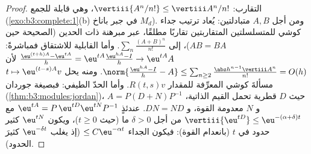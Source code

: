 \begin{proof}
التقارب: $\vertiii{A^n/n!} \leq \vertiii A^n/n!$، وهي قابلة للجمع (\cref{exo:b3:complete:1}(b) في جبر باناخ
$M_d$). ومن أجل $A, B$ متبادلتين: يُعاد ترتيب جداء كوشي
للمتسلسلتين المتقاربتين تقاربًا مطلقًا، عبر مبرهنة ذات الحدين
(الصحيحة حين $AB = BA$)، إلى $\sum_n\frac{(A+B)^n}{n!}$. وأما القابلية للاشتقاق
فمباشرةً: $\frac{\eu^{(t+h)A} - \eu^{tA}}h = \eu^{tA}\frac{\eu^{hA} -
I}{h} \to \eu^{tA}A$ لأن $\norm{\frac{\eu^{hA} - I}h - A}
\leq \sum_{n\geq2}\frac{\abs h^{n-1}\vertiii A^n}{n!} =
O(h)$. ومنه يحل $t \mapsto \eu^{(t - s)A}v$ مسألةَ كوشي
المعرِّفة للمقدار $R(t,s)v$. وأما الحدّ الطيفي: فبصيغة جوردان
(\cref{thm:b3:modules:jordan})، $A = P(D + N)P^{-1}$ حيث $D$ قطرية تحمل القيم الذاتية،
و $N$ معدومة القوة، و $DN =
ND$. عندئذٍ $\eu^{tA} = P\,\eu^{tD}\eu^{tN}P^{-1}$ مع $\vertiii{\eu^{tD}} \leq \eu^{-(\alpha + \delta)t}$ من أجل
$\delta > 0$ ما (حيث $t \geq 0$)، ويكون $\eu^{tN}$ كثير حدود
في $t$ (بانعدام القوة): فيكون الجداء $\leq C\eu^{-\alpha t}$ (إذ يغلب $\eu^{-\delta t}$
كثيرَ الحدود).
\end{proof}

